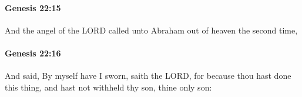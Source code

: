 		\paragraph{Genesis 22:15} %
			\label{GENESIS-22-15}

			And the angel of the LORD called unto Abraham out of heaven the second time,


		\paragraph{Genesis 22:16} %
			\label{GENESIS-22-16}

			And said, By myself have I sworn, saith the LORD, for because thou hast done this thing, and hast not withheld thy son, thine only son:


